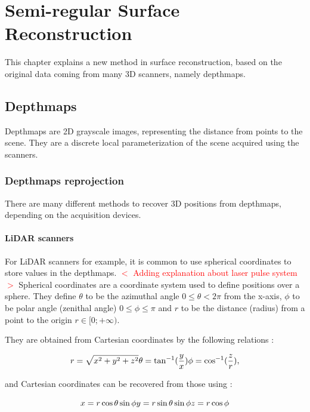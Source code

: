 \documentclass[11pt,fleqn]{book} %
\newcommand{\arnaud}[1]{\textcolor{red}{$<$ #1 $>$}}
\begin{document}
\chapter{Semi-regular Surface Reconstruction}

This chapter explains a new method in surface reconstruction, based on the original data coming from many 3D scanners, namely depthmaps.

\section{Depthmaps}
Depthmaps are 2D grayscale images, representing the distance from points to the scene. They are a discrete local parameterization of the scene acquired using the scanners.

\subsection{Depthmaps reprojection}
There are many different methods to recover 3D positions from depthmaps, depending on the acquisition devices.

\subsubsection{LiDAR scanners}
For LiDAR scanners for example, it is common to use spherical coordinates to store values in the depthmaps.
\arnaud{Adding explanation about laser pulse system}
Spherical coordinates \cite{Wal67} are a coordinate system used to define positions over a sphere. 
They define $\theta$ to be the azimuthal angle $0 \leq \theta < 2\pi$ from the x-axis, $\phi$ to be polar angle (zenithal angle) $0 \leq \phi \leq \pi$ and $r$ to be the distance (radius) from a point to the origin $r \in [0;+\infty)$.

They are obtained from Cartesian coordinates by the following relations : 

\begin{equation}
\label{eq:cartesian_to_spherical}
	r = \sqrt{x^2 + y^2 + z^2} \\
	\theta = \tan^{-1}(\frac{y}{x})\\
	\phi = \cos^{-1}(\frac{z}{r}),
\end{equation}

and Cartesian coordinates can be recovered from those using : 

\begin{equation}
\label{eq:spherical_to_cartesian}
	x = r\cos\theta\sin\phi\\
	y = r\sin\theta\sin\phi\\
	z = r\cos\phi
\end{equation}
\end{document}
